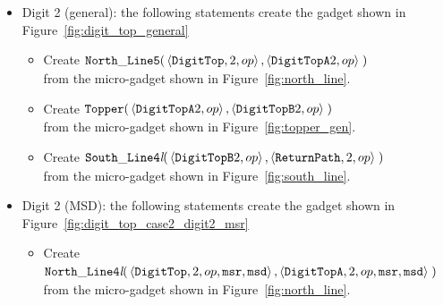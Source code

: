 \begin{itemize}
        \item Digit 2 (general): the following statements create the gadget shown in Figure~\ref{fig:digit_top_general}
        \begin{itemize}
            \item Create
            $\begin{aligned}[t]
                {\tt North\_Line5}(& \left\langle {\tt DigitTop}, 2, op \right\rangle,
                                     \left\langle {\tt DigitTopA} 2, op \right\rangle \;)
            \end{aligned}$\\from the micro-gadget shown in Figure~\ref{fig:north_line}.

            \item Create
            $\begin{aligned}[t]
                {\tt Topper}(& \left\langle {\tt DigitTopA} 2, op \right\rangle,
                               \left\langle {\tt DigitTopB} 2, op \right\rangle \;)
            \end{aligned}$\\from the micro-gadget shown in Figure~\ref{fig:topper_gen}.

            \item Create
            $\begin{aligned}[t]
                {\tt South\_Line4\textit{l}}(& \left\langle {\tt DigitTopB} 2, op \right\rangle,
                                               \left\langle {\tt ReturnPath},    2, op \right\rangle \;)
            \end{aligned}$\\from the micro-gadget shown in Figure~\ref{fig:south_line}.
        \end{itemize}
        \vspace{1cm}


        \item Digit 2 (MSD): the following statements create the gadget shown in Figure~\ref{fig:digit_top_case2_digit2_msr}
        \begin{itemize}
            \item Create
            $\begin{aligned}[t]
                {\tt North\_Line4\textit{l}}(& \left\langle {\tt DigitTop},  2, op, {\tt msr}, {\tt msd} \right\rangle,
                                               \left\langle {\tt DigitTopA}, 2, op, {\tt msr}, {\tt msd} \right\rangle\;)
            \end{aligned}$\\ from the micro-gadget shown in Figure~\ref{fig:north_line}.


\end{itemize}
\end{itemize}
